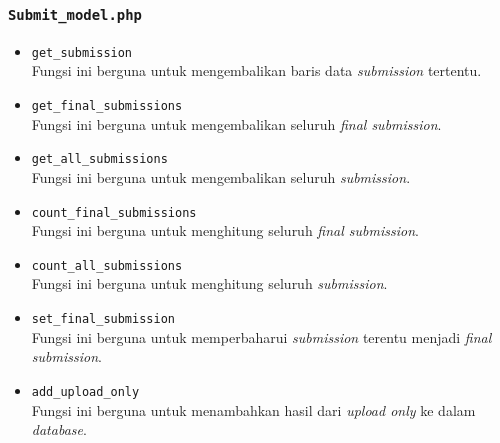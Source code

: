 \subsubsection{\texttt{Submit\_model.php}}
\begin{itemize}
	\item \texttt{get\_submission}\\
	Fungsi ini berguna untuk mengembalikan baris data \textit{submission} tertentu.
	\item \texttt{get\_final\_submissions}\\
	Fungsi ini berguna untuk mengembalikan seluruh \textit{final submission}.
	\item \texttt{get\_all\_submissions}\\
	Fungsi ini berguna untuk mengembalikan seluruh \textit{submission}.
	\item \texttt{count\_final\_submissions}\\
	Fungsi ini berguna untuk menghitung seluruh \textit{final submission}.
	\item \texttt{count\_all\_submissions}\\
	Fungsi ini berguna untuk menghitung seluruh \textit{submission}.
	\item \texttt{set\_final\_submission}\\
	Fungsi ini berguna untuk memperbaharui \textit{submission} terentu menjadi \textit{final submission}.
	\item \texttt{add\_upload\_only}\\
	Fungsi ini berguna untuk menambahkan hasil dari \textit{upload only} ke dalam \textit{database}.
\end{itemize}
